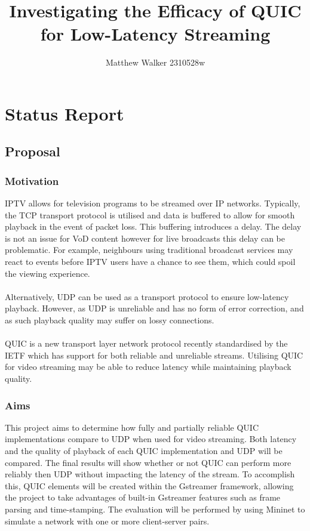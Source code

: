 \documentclass[11pt]{article}
\title{Investigating the Efficacy of QUIC for Low-Latency Streaming}
\author{Matthew Walker 2310528w}
\begin{document}
    \maketitle
    
    
     

\section{Status Report}

\subsection{Proposal}\label{proposal}

\subsubsection{Motivation}\label{motivation}

IPTV allows for television programs to be streamed over IP networks. Typically, 
the TCP transport protocol is utilised and data is buffered to allow for smooth
playback in the event of packet loss. This buffering introduces a delay. The delay
is not an issue for VoD content however for live broadcasts this delay can be problematic.
For example, neighbours using traditional broadcast services may react to events before
IPTV users have a chance to see them, which could spoil the viewing experience. 
\\\\
Alternatively, UDP can be used as a transport protocol to ensure low-latency playback. 
However, as UDP is unreliable and has no form of error correction, and as such playback
quality may suffer on lossy connections.
\\\\
QUIC is a new transport layer network protocol recently standardised by the IETF which 
has support for both reliable and unreliable streams. Utilising QUIC for video streaming
may be able to reduce latency while maintaining playback quality.

\subsubsection{Aims}\label{aims}

This project aims to determine how fully and partially reliable QUIC implementations compare to UDP when used for video streaming.
Both latency and the quality of playback of each QUIC implementation and UDP will be compared. The final results will show whether or not 
QUIC can perform more reliably then UDP without impacting the latency of the stream. To accomplish this, QUIC elements will be created within the Gstreamer framework,
allowing the project to take advantages of built-in Gstreamer features such as frame parsing and time-stamping. The evaluation will be performed
by using Mininet to simulate a network with one or more client-server pairs.
\end{document}
